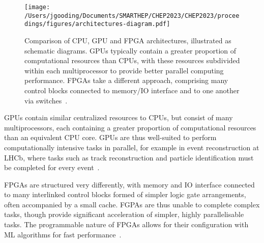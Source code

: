 \begin{figure*}[h!]
    \centering
    \texttt{[image: /Users/jgooding/Documents/SMARTHEP/CHEP2023/CHEP2023/proceedings/figures/architectures-diagram.pdf]}
    \caption{Comparison of CPU, GPU and FPGA architectures, illustrated as schematic diagrams. GPUs typically contain a greater proportion of computational resources than CPUs, with these resources subdivided within each multiprocessor to provide better parallel computing performance. FPGAs take a different approach, comprising many control blocks connected to memory/IO interface and to one another via switches~\cite{architectures}.}
    \label{architectures}
\end{figure*}

GPUs contain similar centralized resources to CPUs, but consist of many multiprocessors, each containing a greater proportion of computational resources than an equivalent CPU core. GPUs are thus well-suited to perform computationally intensive tasks in parallel, for example in event reconstruction at LHCb, where tasks such as track reconstruction and particle identification must be completed for every event~\cite{vomBruch-gpus}.

FPGAs are structured very differently, with memory and IO interface connected to many interlinked control blocks formed of simpler logic gate arrangements, often accompanied by a small cache. FGPAs are thus unable to complete complex tasks, though provide significant acceleration of simpler, highly parallelisable tasks. The programmable nature of FPGAs allows for their configuration with ML algorithms for fast performance~\cite{duarte-fpgas, muons-fpgas}.